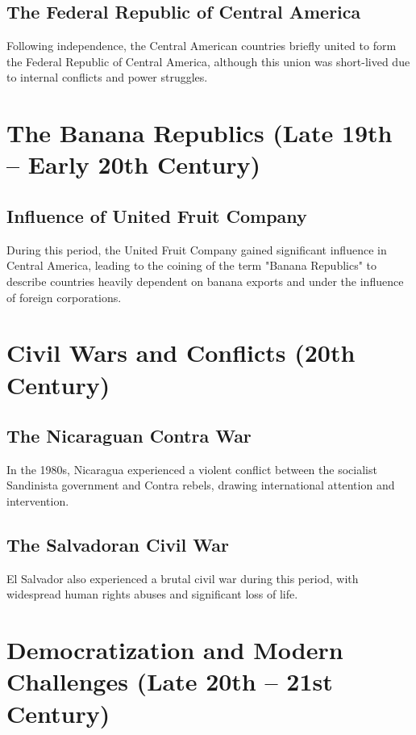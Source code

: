 \documentclass[a4paper,12pt]{book}
\begin{document}
\subsection{The Federal Republic of Central America}
\label{subsec:federal-republic}
Following independence, the Central American countries briefly united to form the Federal Republic of Central America, although this union was short-lived due to internal conflicts and power struggles.

\section{The Banana Republics (Late 19th – Early 20th Century)}
\label{sec:banana-republics}
\subsection{Influence of United Fruit Company}
\label{subsec:influence-united-fruit}
During this period, the United Fruit Company gained significant influence in Central America, leading to the coining of the term "Banana Republics" to describe countries heavily dependent on banana exports and under the influence of foreign corporations.

\section{Civil Wars and Conflicts (20th Century)}
\label{sec:civil-wars-conflicts}
\subsection{The Nicaraguan Contra War}
\label{subsec:nicaraguan-contra-war}
In the 1980s, Nicaragua experienced a violent conflict between the socialist Sandinista government and Contra rebels, drawing international attention and intervention.

\subsection{The Salvadoran Civil War}
\label{subsec:salvadoran-civil-war}
El Salvador also experienced a brutal civil war during this period, with widespread human rights abuses and significant loss of life.

\section{Democratization and Modern Challenges (Late 20th – 21st Century)}
\label{sec:democratization-modern-challenges}
\end{document}
